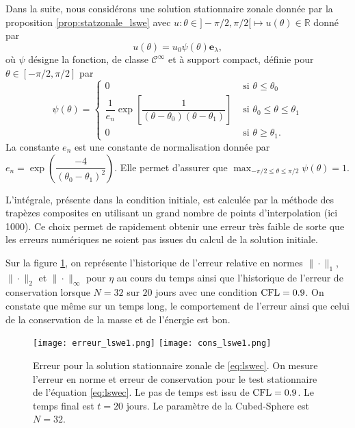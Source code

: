 Dans la suite, nous considérons une solution stationnaire zonale donnée par la proposition \ref{prop:statzonale_lswe} avec $u : \theta \in ]-\pi/2,\pi/2[ \mapsto u(\theta) \in \mathbb{R}$ donné par
\begin{equation}
u(\theta) = u_0 \psi(\theta) \mathbf{e}_{\lambda},
\end{equation}
où $\psi$ désigne la fonction, de classe $\mathcal{C}^{\infty}$ et à support compact, définie pour $\theta \in [-\pi/2, \pi/2]$ par
\begin{equation}
\psi(\theta) = \left\lbrace
\begin{array}{ll}
0 & \text{ si } \theta \leq \theta_0 \\
\dfrac{1}{e_n} \exp \left[ \dfrac{1}{(\theta-\theta_0)(\theta- \theta_1)} \right] & \text{ si } \theta_0 \leq \theta \leq \theta_1 \\
0 & \text{ si } \theta \geq \theta_1.
\end{array}
\right.
\label{eq:psi_supcompact}
\end{equation}
La constante $e_n$ est une constante de normalisation donnée par $e_n = \exp \left( \dfrac{-4}{(\theta_0 - \theta_1)^2} \right)$. Elle permet d'assurer que $\max_{- \pi/2 \leq \theta \leq \pi/2} \psi(\theta) = 1$.

L'intégrale, présente dans la condition initiale, est calculée par la méthode des trapèzes composites en utilisant un grand nombre de points d'interpolation (ici 1000). Ce choix permet de rapidement obtenir une erreur très faible de sorte que les erreurs numériques ne soient pas issues du calcul de la solution initiale.

Sur la figure \ref{fig:lswec_hist}, on représente l'historique de l'erreur relative en normes $\| \cdot \|_1$, $\| \cdot \|_2$ et $\| \cdot \|_{\infty}$ pour $\eta$ au cours du temps ainsi que l'historique de l'erreur de conservation lorsque $N=32$ sur $20$ jours avec une condition $\text{CFL} = 0.9$. On constate que même sur un temps long, le comportement de l'erreur ainsi que celui de la conservation de la masse et de l'énergie est bon.

\begin{figure}[htbp]
\begin{center}
\texttt{[image: erreur\_lswe1.png]}
\texttt{[image: cons\_lswe1.png]}
\end{center}
\caption{Erreur pour la solution stationnaire zonale de \eqref{eq:lswec}. On mesure l'erreur en norme et erreur de conservation pour le test stationnaire de l'équation \eqref{eq:lswec}. Le pas de temps est issu de $\text{CFL}=0.9$. Le temps final est $t=20$ jours. Le paramètre de la Cubed-Sphere est $N=32$.}
\label{fig:lswec_hist}
\end{figure}

